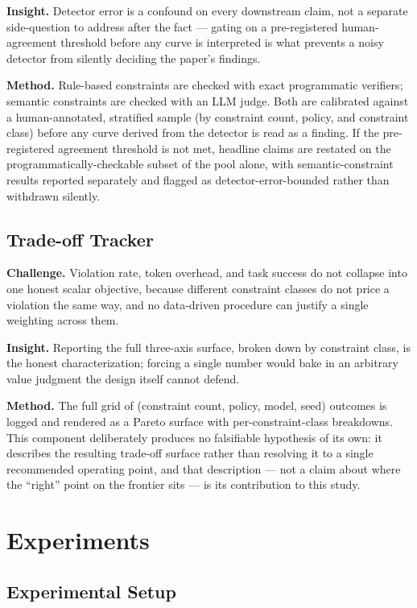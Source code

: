 \documentclass[11pt]{article}
\begin{document}
\textbf{Insight.} Detector error is a confound on every downstream claim, not a separate side-question to address after the fact --- gating on a pre-registered human-agreement threshold before any curve is interpreted is what prevents a noisy detector from silently deciding the paper's findings.

\textbf{Method.} Rule-based constraints are checked with exact programmatic verifiers; semantic constraints are checked with an LLM judge. Both are calibrated against a human-annotated, stratified sample (by constraint count, policy, and constraint class) before any curve derived from the detector is read as a finding. If the pre-registered agreement threshold is not met, headline claims are restated on the programmatically-checkable subset of the pool alone, with semantic-constraint results reported separately and flagged as detector-error-bounded rather than withdrawn silently.

\subsection{Trade-off Tracker}
\textbf{Challenge.} Violation rate, token overhead, and task success do not collapse into one honest scalar objective, because different constraint classes do not price a violation the same way, and no data-driven procedure can justify a single weighting across them.

\textbf{Insight.} Reporting the full three-axis surface, broken down by constraint class, is the honest characterization; forcing a single number would bake in an arbitrary value judgment the design itself cannot defend.

\textbf{Method.} The full grid of (constraint count, policy, model, seed) outcomes is logged and rendered as a Pareto surface with per-constraint-class breakdowns. This component deliberately produces no falsifiable hypothesis of its own: it describes the resulting trade-off surface rather than resolving it to a single recommended operating point, and that description --- not a claim about where the ``right'' point on the frontier sits --- is its contribution to this study.

\section{Experiments}

\subsection{Experimental Setup}
\end{document}
